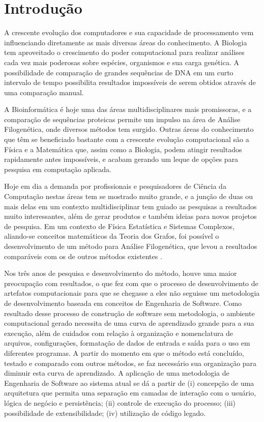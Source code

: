 \chapter{Introdução}

A crescente evolução dos computadores e sua capacidade de processamento vem influenciando diretamente as mais diversas áreas do conhecimento. A Biologia
tem aproveitado o crescimento do poder computacional para realizar análises cada vez mais poderosas sobre espécies, organismos e sua carga genética.
A possibilidade de comparação de grandes sequências de DNA em um curto intervalo de tempo possibilita resultados impossíveis de serem obtidos através
de uma comparação manual.

A Bioinformática é hoje uma das áreas multidisciplinares mais promissoras, e a comparação de sequências proteicas permite um impulso na área de Análise
Filogenética, onde diversos métodos tem surgido. Outras áreas do conhecimento que têm se beneficiado bastante com a crescente evolução computacional são a
Física e a Matemática que, assim como a Biologia, podem atingir resultados rapidamente antes impossíveis, e acabam gerando um leque de opções para pesquisa
em computação aplicada.

Hoje em dia a demanda por profissionais e pesquisadores de Ciência da Computação nestas áreas tem se mostrado muito grande, e a junção de duas ou mais delas
em um contexto multidisciplinar tem guiado as pesquisas a resultados muito interessantes, além de gerar produtos e também ideias para novos projetos de
pesquisa. Em um contexto de Física Estatística e Sistemas Complexos, aliando-se conceitos matemáticos da Teoria dos Grafos, foi possível o
desenvolvimento de um método para Análise Filogenética, que levou a resultados comparáveis com os de outros métodos existentes \cite{andrade2011}.

Nos três anos de pesquisa e desenvolvimento do método, houve uma maior preocupação com resultados, o que fez com que o processo de desenvolvimento de
artefatos computacionais  para que se chegasse a eles não seguisse um metodologia de desenvolvimento baseada em conceitos de Engenharia de Software. Como
resultado desse processo de construção de software sem metodologia, o ambiente computacional gerado necessita de
uma curva de aprendizado grande para a sua execução, além de cuidados com relação à organização e nomenclatura de arquivos, configurações,
formatação de dados de entrada e saída para o uso em diferentes programas. A partir do momento em que o método está concluído, testado e comparado com
outros métodos, se faz necessário sua organização para diminuir esta curva de aprendizado. A aplicação de uma metodologia de Engenharia de Software ao
sistema atual se dá a partir de (i) concepção de uma arquitetura que permita uma separação em camadas de interação com o usuário, lógica de negócio e
persistência; (ii) controle de execução do processo; (iii) possibilidade de extensibilidade; (iv) utilização de código legado.

